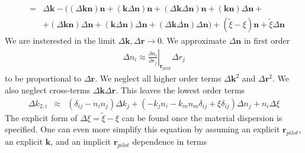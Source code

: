\documentclass[12pt,a4paper,twoside,openright,BCOR10mm,headsepline,titlepage,abstracton,chapterprefix,final]{scrreprt}
\newcommand\Vector[1]{{\mathbf{#1}}}
\newcommand\wavenumber{k}
\newcommand\Wavevector{\Vector{\wavenumber}}
\begin{document}
\begin{eqnarray}
 &=& \Delta\Wavevector - 
 \bigg(
   (\Delta\Wavevector \Vector{n} )\Vector{n} 
   + (\Wavevector \Delta\Vector{n} )\Vector{n}  + (\Delta\Wavevector \Delta\Vector{n} )\Vector{n} 
   + (\Wavevector \Vector{n} )\Delta\Vector{n}  + 
  \nonumber \\ &&
   + (\Delta\Wavevector \Vector{n} )\Delta\Vector{n} 
   + (\Wavevector \Delta\Vector{n} )\Delta\Vector{n}
   + (\Delta\Wavevector \Delta\Vector{n} )\Delta\Vector{n}
 \bigg) 
 + ( \tilde{\xi} - \xi ) \Vector{n} + \tilde{\xi} \Delta\Vector{n}
\end{eqnarray}
We are insterested in the limit $\Delta\Wavevector, \Delta\Vector{r} \rightarrow 0$. We approximate $\Delta\Vector{n}$ in first order
\begin{eqnarray}
 \Delta n_i \approx \left. \frac{\partial n_i}{\partial r_j} \right|_{\Vector{r}_{pilot}} \Delta r_j
\end{eqnarray}
to be proportional to $\Delta\Vector{r}$. 
We neglect all higher order terms $\Delta\Wavevector^2$ and $\Delta\Vector{r}^2$.
We also neglect cross-terms $\Delta\Wavevector\Delta\Vector{r}$. 
This leaves the lowest order terms
\begin{eqnarray}
 \Delta \wavenumber_{2,i} &\approx& 
   \left( \delta_{ij}  - n_i n_j \right) \Delta\wavenumber_j
   +
   \left(
     - \wavenumber_j  n_i 
     - \wavenumber_m n_m \delta_{ij}  
     + \xi \delta_{ij}
   \right) \Delta n_j
   + n_i \Delta\xi 
\end{eqnarray}
The explicit form of $\Delta\xi = \tilde{\xi} - \xi$ can be found once the material dispersion is specified.
One can even more simplify this equation by assuming an explicit $\Vector{r}_{pilot}$, an explicit $\Wavevector$, and an implicit $\Vector{r}_{pilot}$ dependence in terms
\end{document}
